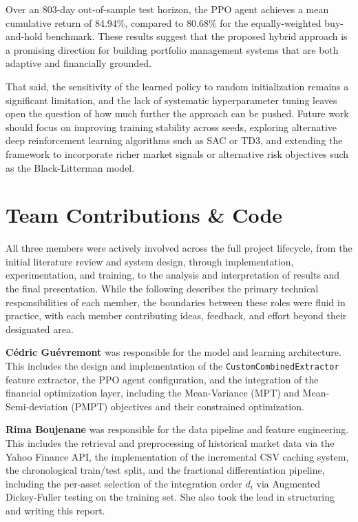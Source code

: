 \documentclass[final]{article}
\begin{document}
Over an 803-day out-of-sample test horizon, the PPO agent achieves a mean cumulative return of 84.94\%, compared to
80.68\% for the equally-weighted buy-and-hold benchmark. These results suggest that the proposed hybrid
approach is a promising direction for building portfolio management systems that are both adaptive and financially
grounded.

That said, the sensitivity of the learned policy to random initialization remains a significant limitation, and the lack
of systematic hyperparameter tuning leaves open the question of how much further the approach can be pushed. Future work
should focus on improving training stability across seeds, exploring alternative deep reinforcement learning algorithms
such as SAC or TD3, and extending the framework to incorporate richer market signals or alternative risk objectives such
as the Black-Litterman model.

\section{Team Contributions \& Code}
All three members were actively involved across the full project lifecycle, from the initial literature review and
system design, through implementation, experimentation, and training, to the analysis and interpretation of results and
the final presentation. While the following describes the primary technical responsibilities of each member, the
boundaries between these roles were fluid in practice, with each member contributing ideas, feedback, and effort beyond
their designated area.

\textbf{Cédric Guévremont} was responsible for the model and learning architecture.
This includes the design and implementation of the \texttt{CustomCombinedExtractor} feature extractor, the PPO agent
configuration, and the integration of the financial optimization layer, including the Mean-Variance (MPT) and
Mean-Semi-deviation (PMPT) objectives and their constrained optimization.

\textbf{Rima Boujenane} was responsible for the data pipeline and feature engineering. This includes the retrieval and
preprocessing of historical market data via the Yahoo Finance API, the implementation of the incremental CSV caching
system, the chronological train/test split, and the fractional differentiation pipeline, including the per-asset
selection of the integration order $d_i$ via Augmented Dickey-Fuller testing on the training set. She also took the lead in
structuring and writing this report.
\end{document}
